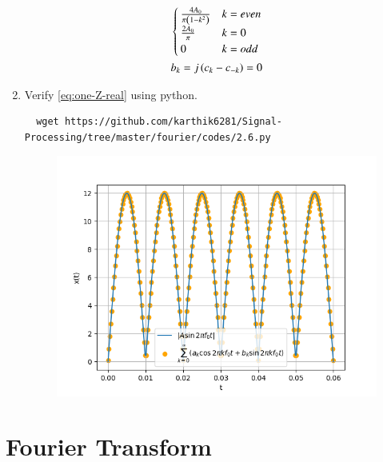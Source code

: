 \documentclass[journal,12pt,twocolumn]{IEEEtran}
\renewcommand\thesection{\arabic{section}}
\begin{document}
\begin{enumerate}[label=\thesection.\arabic*,ref=\thesection.\theenumi]
\begin{align}
\begin{cases}
\frac{4A_0}{\pi\left(1-k^2\right)}&k=even
\\
\frac{2A_0}{\pi}&k=0
\\
0&k=odd
\end{cases}\\
b_k=j\left(c_k-c_{-k}\right)=0
    \end{align}
\item Verify 
\eqref{eq:one-Z-real}
using python.\\
\solution 
  \begin{lstlisting}
  wget https://github.com/karthik6281/Signal-Processing/tree/master/fourier/codes/2.6.py
  \end{lstlisting}
    \begin{figure}[!ht]
\centering
\includegraphics[width=\columnwidth]{./figs/2.6}
\caption{}
\end{figure}

\end{enumerate}
\section{Fourier Transform}

 
\end{document}
